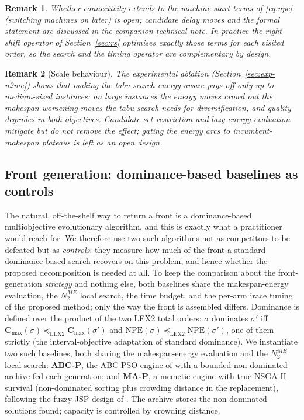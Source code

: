 \documentclass[preprint,12pt]{elsarticle}
\newtheorem{remark}{Remark}
\newcommand{\NPE}{\mathrm{NPE}}
\newcommand{\lexle}{\preceq_{\mathrm{LEX2}}}
\begin{document}
\begin{remark}
Whether connectivity extends to the machine \emph{start} terms of
\eqref{eq:npe} (switching machines on later) is open; candidate delay
moves and the formal statement are discussed in the companion technical
note. In practice the right-shift operator of Section~\ref{sec:rs}
optimises exactly those terms for each visited order, so the search and
the timing operator are complementary by design.
\end{remark}

\begin{remark}[Scale behaviour]
\label{rem:n2me-scale}
The experimental ablation (Section~\ref{sec:exp-n2me}) shows that making
the tabu search energy-aware pays off only up to medium-sized instances:
on large instances the energy moves crowd out the makespan-worsening
moves the tabu search needs for diversification, and quality degrades in
both objectives. Candidate-set restriction and lazy energy evaluation
mitigate but do not remove the effect; gating the energy arcs to
incumbent-makespan plateaus is left as an open design.
\end{remark}

\subsection{Front generation: dominance-based baselines as controls}
\label{sec:pareto-baselines}

The natural, off-the-shelf way to return a front is a dominance-based
multiobjective evolutionary algorithm, and this is exactly what a
practitioner would reach for. We therefore use two such algorithms not as
competitors to be defeated but as \emph{controls}: they measure how much of
the front a standard dominance-based search recovers on this problem, and
hence whether the proposed decomposition is needed at all. To keep the
comparison about the front-generation \emph{strategy} and nothing else, both
baselines share the makespan-energy evaluation, the $N_2^{ME}$ local search,
the time budget, and the per-arm irace tuning of the proposed method; only
the way the front is assembled differs. Dominance is defined over the product
of the two LEX2 total orders: $\sigma$ dominates $\sigma'$ iff
$\mathbf{C}_{\max}(\sigma)\lexle\mathbf{C}_{\max}(\sigma')$ and
$\mathbf{\NPE}(\sigma)\lexle\mathbf{\NPE}(\sigma')$, one of them strictly
(the interval-objective adaptation of standard dominance). We instantiate
two such baselines, both sharing the makespan-energy evaluation and the
$N_2^{ME}$ local search: \textbf{ABC-P}, the ABC-PSO engine of
\cite{DiazTabu2026} with a bounded non-dominated archive fed each
generation; and \textbf{MA-P}, a memetic engine with true NSGA-II survival
\cite{Deb2002} (non-dominated sorting plus crowding distance in the
replacement), following the fuzzy-JSP design of \cite{Afsar2022}. The archive stores the
non-dominated solutions found; capacity is controlled by crowding distance.
\end{document}

